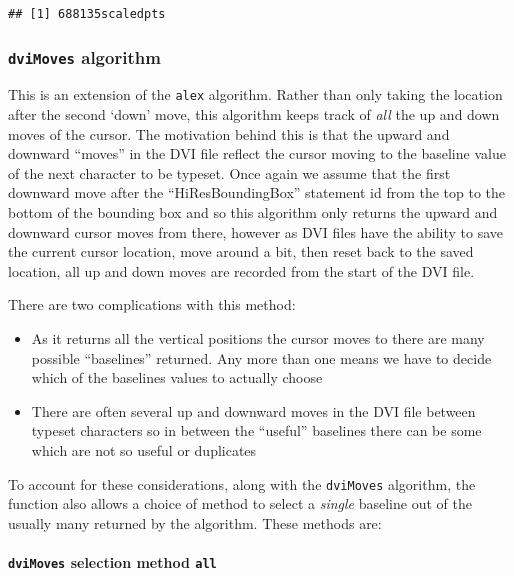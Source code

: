 \documentclass[]{article}
\let\oldparagraph\paragraph
\renewcommand{\paragraph}[1]{\oldparagraph{#1}\mbox{}}
\begin{document}
\begin{verbatim}
## [1] 688135scaledpts
\end{verbatim}

\subsubsection{\texorpdfstring{\texttt{dviMoves}
algorithm}{dviMoves algorithm}}\label{dvimoves-algorithm}

This is an extension of the \texttt{alex} algorithm. Rather than only
taking the location after the second `down' move, this algorithm keeps
track of \emph{all} the up and down moves of the cursor. The motivation
behind this is that the upward and downward ``moves'' in the DVI file
reflect the cursor moving to the baseline value of the next character to
be typeset. Once again we assume that the first downward move after the
``HiResBoundingBox'' statement id from the top to the bottom of the
bounding box and so this algorithm only returns the upward and downward
cursor moves from there, however as DVI files have the ability to save
the current cursor location, move around a bit, then reset back to the
saved location, all up and down moves are recorded from the start of the
DVI file.

There are two complications with this method:

\begin{itemize}
\item
  As it returns all the vertical positions the cursor moves to there are
  many possible ``baselines'' returned. Any more than one means we have
  to decide which of the baselines values to actually choose
\item
  There are often several up and downward moves in the DVI file between
  typeset characters so in between the ``useful'' baselines there can be
  some which are not so useful or duplicates
\end{itemize}

To account for these considerations, along with the \texttt{dviMoves}
algorithm, the function also allows a choice of method to select a
\emph{single} baseline out of the usually many returned by the
algorithm. These methods are:

\paragraph{\texorpdfstring{\texttt{dviMoves} selection method
\texttt{all}}{dviMoves selection method all}}\label{dvimoves-selection-method-all}
\end{document}
